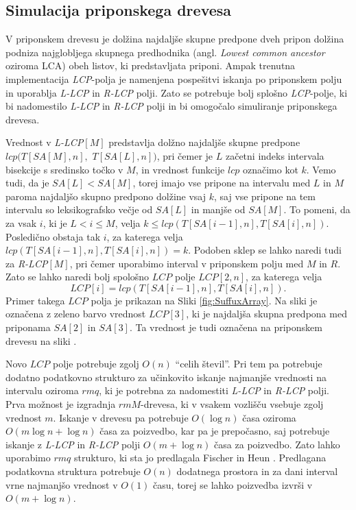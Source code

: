 \subsection{Simulacija priponskega drevesa}\label{sec:STsimulacija}
V priponskem drevesu je dolžina najdaljše skupne predpone dveh pripon dolžina podniza najglobljega skupnega predhodnika (angl. \textit{Lowest common ancestor} oziroma LCA) obeh listov, ki predstavljata priponi. Ampak trenutna implementacija \textit{LCP}-polja je namenjena pospešitvi iskanja po priponskem polju in uporablja \textit{L-LCP} in \textit{R-LCP} polji. Zato se potrebuje bolj splošno \textit{LCP}-polje, ki bi nadomestilo \textit{L-LCP} in \textit{R-LCP} polji in bi omogočalo simuliranje priponskega drevesa.

Vrednost v \textit{L-LCP}$[M]$ predstavlja dolžno najdaljše skupne predpone $lcp(T[SA[M], n],$ $T[SA[L], n])$, pri čemer je $L$ začetni indeks intervala bisekcije s sredinsko točko v $M$, in vrednost funkcije $lcp$ označimo kot $k$. Vemo tudi, da je $SA[L]<SA[M]$, torej imajo vse pripone na intervalu med $L$ in $M$ paroma najdaljšo skupno predpono dolžine vsaj $k$, saj vse pripone na tem intervalu so leksikografsko večje od $SA[L]$ in manjše od $SA[M]$. To pomeni, da za vsak $i$, ki je $L<i\le M$, velja $k\le lcp(T[SA[i-1], n], T[SA[i], n])$. Posledično obstaja tak $i$, za katerega velja $lcp(T[SA[i-1], n], T[SA[i], n])=k$. Podoben sklep se lahko naredi tudi za \textit{R-LCP}$[M]$, pri čemer uporabimo interval v priponskem polju med $M$ in $R$. Zato se lahko naredi bolj spološno $LCP$ polje $LCP[2,n]$, za katerega velja
$$
    LCP[i]=lcp(T[SA[i-1], n], T[SA[i], n]).
$$
Primer takega $LCP$ polja je prikazan na Sliki \ref{fig:SuffuxArray}. Na sliki je označena z zeleno barvo vrednost $LCP[3]$, ki je najdaljša skupna predpona med priponama $SA[2]$ in $SA[3]$. Ta vrednost je tudi označena na priponskem drevesu na sliki \cite{Abouelhoda2004, Kasai2001}.

Novo $LCP$ polje potrebuje zgolj $O(n)$ \enquote{celih števil}. Pri tem pa potrebuje dodatno podatkovno strukturo za učinkovito iskanje najmanjše vrednosti na intervalu oziroma $rmq$, ki je potrebna za nadomestiti \textit{L-LCP} in \textit{R-LCP} polji. Prva možnost je izgradnja $rmM$-drevesa, ki v vsakem vozlišču vsebuje zgolj vrednost $m$. Iskanje v drevesu pa potrebuje $O(\log{n})$ časa oziroma $O(m\log{n}+\log{n})$ časa za poizvedbo, kar pa je prepočasno, saj potrebuje iskanje z \textit{L-LCP} in \textit{R-LCP} polji $O(m+\log{n})$ časa za poizvedbo. Zato lahko uporabimo $rmq$ strukturo, ki sta jo predlagala Fischer in Heun \cite{Fischer2007}. Predlagana podatkovna struktura potrebuje $O(n)$ dodatnega prostora in za dani interval vrne najmanjšo vrednost v $O(1)$ času, torej se lahko poizvedba izvrši v $O(m+\log{n})$.

